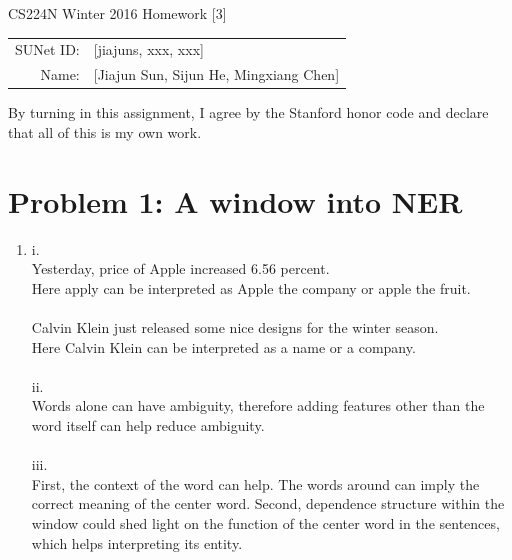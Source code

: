 \documentclass[10pt]{article}
\begin{document}
\begin{center}
{\Large CS224N Winter 2016 Homework [3]}

\begin{tabular}{rl}
SUNet ID: & [jiajuns, xxx, xxx] \\
Name: & [Jiajun Sun, Sijun He, Mingxiang Chen] \\
\end{tabular}
\end{center}

By turning in this assignment, I agree by the Stanford honor code and declare
that all of this is my own work.

\section*{Problem 1: A window into NER}
\begin{enumerate}[label=(\alph*)]
\item
i.\\
Yesterday, price of Apple increased 6.56 percent.\\
Here apply can be interpreted as Apple the company or apple the fruit.\\
\\
Calvin Klein just released some nice designs for the winter season.\\
Here Calvin Klein can be interpreted as a name or a company.\\
\\

ii.\\
Words alone can have ambiguity, therefore adding features other than the word itself can help reduce ambiguity.\\
\\

iii.\\
First, the context of the word can help. The words around can imply the correct meaning of the center word.
Second, dependence structure within the window could shed light on the function of the center word in the sentences, which helps interpreting its entity.


\end{enumerate}
\end{document}
